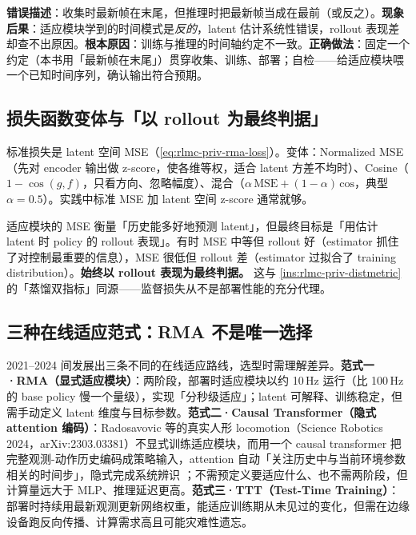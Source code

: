 \begin{pitfall}
\textbf{错误描述}：收集时最新帧在末尾，但推理时把最新帧当成在最前（或反之）。\textbf{现象后果}：适应模块学到的时间模式是\emph{反的}，latent 估计系统性错误，rollout 表现差却查不出原因。\textbf{根本原因}：训练与推理的时间轴约定不一致。\textbf{正确做法}：固定一个约定（本书用「最新帧在末尾」）贯穿收集、训练、部署；自检——给适应模块喂一个已知时间序列，确认输出符合预期。
\end{pitfall}

\subsection{损失函数变体与「以 rollout 为最终判据」}
\label{sec:rlmc-priv-estloss}

标准损失是 latent 空间 MSE（\cref{eq:rlmc-priv-rma-loss}）。变体：Normalized MSE（先对 encoder 输出做 z-score，使各维等权，适合 latent 方差不均时）、Cosine（$1-\cos(g,f)$，只看方向、忽略幅度）、混合（$\alpha\,\text{MSE}+(1-\alpha)\,\text{cos}$，典型 $\alpha=0.5$）。实践中标准 MSE 加 latent 空间 z-score 通常就够。

\begin{insight}\label{ins:rlmc-priv-msevsrollout}
适应模块的 MSE 衡量「历史能多好地预测 latent」，但最终目标是「用估计 latent 时 policy 的 rollout 表现」。有时 MSE 中等但 rollout 好（estimator 抓住了对控制最重要的信息），MSE 很低但 rollout 差（estimator 过拟合了 training distribution）。\textbf{始终以 rollout 表现为最终判据。} 这与 \cref{ins:rlmc-priv-distmetric} 的「蒸馏双指标」同源——监督损失从不是部署性能的充分代理。
\end{insight}

\subsection{三种在线适应范式：RMA 不是唯一选择}
\label{sec:rlmc-priv-paradigms}

2021--2024 间发展出三条不同的在线适应路线，选型时需理解差异。\textbf{范式一·RMA（显式适应模块）}：两阶段，部署时适应模块以约 10\,Hz 运行（比 100\,Hz 的 base policy 慢一个量级），实现「分秒级适应」；latent 可解释、训练稳定，但需手动定义 latent 维度与目标参数。\textbf{范式二·Causal Transformer（隐式 attention 编码）}：Radosavovic 等的真实人形 locomotion（Science Robotics 2024，arXiv:2303.03381）不显式训练适应模块，而用一个 causal transformer 把完整观测-动作历史编码成策略输入，attention 自动「关注历史中与当前环境参数相关的时间步」，隐式完成系统辨识 \cite{radosavovic2024humanoid}；不需预定义要适应什么、也不需两阶段，但计算量远大于 MLP、推理延迟更高。\textbf{范式三·TTT（Test-Time Training）}：部署时持续用最新观测更新网络权重，能适应训练期从未见过的变化，但需在边缘设备跑反向传播、计算需求高且可能灾难性遗忘。

